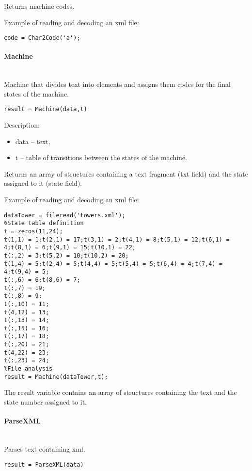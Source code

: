 Returns machine codes.

Example of reading and decoding an xml file:
\begin{lstlisting}[style=Matlab-editor]
%Character conversion
code = Char2Code('a');
\end{lstlisting}

\paragraph{Machine} \hspace{0pt} \\
Machine that divides text into elements and assigns them codes for the final states of the machine.
\begin{lstlisting}[style=Matlab-editor]
result = Machine(data,t)
\end{lstlisting}

Description:
\begin{itemize}
\item data -- text,
\item t -- table of transitions between the states of the machine.
\end{itemize}

Returns an array of structures containing a text fragment (txt field) and the state assigned to it (state field).

Example of reading and decoding an xml file:
\begin{lstlisting}[style=Matlab-editor]
%Reading xml file
dataTower = fileread('towers.xml');
%State table definition
t = zeros(11,24);
t(1,1) = 1;t(2,1) = 17;t(3,1) = 2;t(4,1) = 8;t(5,1) = 12;t(6,1) = 4;t(8,1) = 6;t(9,1) = 15;t(10,1) = 22;
t(:,2) = 3;t(5,2) = 10;t(10,2) = 20;
t(1,4) = 5;t(2,4) = 5;t(4,4) = 5;t(5,4) = 5;t(6,4) = 4;t(7,4) = 4;t(9,4) = 5;
t(:,6) = 6;t(8,6) = 7;
t(:,7) = 19;
t(:,8) = 9;
t(:,10) = 11;
t(4,12) = 13;
t(:,13) = 14;
t(:,15) = 16;
t(:,17) = 18;
t(:,20) = 21;
t(4,22) = 23;
t(:,23) = 24;
%File analysis
result = Machine(dataTower,t);
\end{lstlisting}

The result variable contains an array of structures containing the text and the state number assigned to it. 

\paragraph{ParseXML} \hspace{0pt} \\
Parses text containing xml.
\begin{lstlisting}[style=Matlab-editor]
result = ParseXML(data)
\end{lstlisting}

